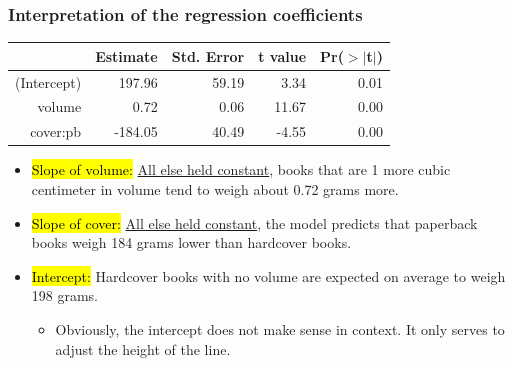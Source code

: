 \begin{frame}
\frametitle{Interpretation of the regression coefficients}

{\small
\begin{center}
\begin{tabular}{rrrrr}
  \hline
 & Estimate & Std. Error & t value & Pr($>$$|$t$|$) \\ 
  \hline
(Intercept) & 197.96 & 59.19 & 3.34 & 0.01 \\ 
  volume & 0.72 & 0.06 & 11.67 & 0.00 \\ 
  cover:pb & -184.05 & 40.49 & -4.55 & 0.00 \\ 
   \hline
\end{tabular}
\end{center}
}

\pause

\begin{itemize}

\item \hl{Slope of volume:} \underline{All else held constant}, books that are 1 more cubic centimeter in volume tend to weigh about 0.72 grams more.

\pause

\item \hl{Slope of cover:} \underline{All else held constant}, the model predicts that paperback books weigh 184 grams lower than hardcover books.

\pause

\item \hl{Intercept:} Hardcover books with no volume are expected on average to weigh 198 grams. \pause
\begin{itemize}
\item Obviously, the intercept does not make sense in context. It only serves to adjust the height of the line.
\end{itemize}

\end{itemize}

\end{frame}


